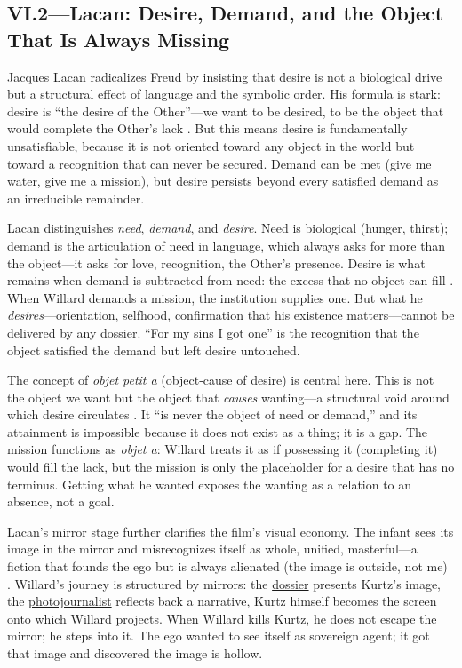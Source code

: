 \subsection*{VI.2—Lacan: Desire, Demand, and the Object That Is Always Missing}
\label{ssec:vi-lacan}

Jacques Lacan radicalizes Freud by insisting that desire is not a biological drive but a
structural effect of language and the symbolic order. His formula is stark: desire is ``the
desire of the Other''---we want to be desired, to be the object that would complete the
Other's lack \parencite{LacanEcrits2006}. But this means desire is fundamentally
unsatisfiable, because it is not oriented toward any object in the world but toward a
recognition that can never be secured. Demand can be met (give me water, give me a mission),
but desire persists beyond every satisfied demand as an irreducible remainder.

Lacan distinguishes \emph{need}, \emph{demand}, and \emph{desire}. Need is biological (hunger,
thirst); demand is the articulation of need in language, which always asks for more than the
object---it asks for love, recognition, the Other's presence. Desire is what remains when
demand is subtracted from need: the excess that no object can fill
\parencite{LacanEcrits2006}. When Willard demands a mission, the institution supplies one. But
what he \emph{desires}---orientation, selfhood, confirmation that his existence
matters---cannot be delivered by any dossier. ``For my sins I got one'' is the recognition
that the object satisfied the demand but left desire untouched.

The concept of \emph{objet petit a} (object-cause of desire) is central here. This is not the
object we want but the object that \emph{causes} wanting---a structural void around which
desire circulates \parencite[p.~103]{LacanSeminarXI1991}. It ``is never the object of need or
demand,'' and its attainment is impossible because it does not exist as a thing; it is a gap.
The mission functions as \emph{objet a}: Willard treats it as if possessing it (completing it)
would fill the lack, but the mission is only the placeholder for a desire that has no
terminus. Getting what he wanted exposes the wanting as a relation to an absence, not a goal.

Lacan's mirror stage further clarifies the film's visual economy. The infant sees its image in
the mirror and misrecognizes itself as whole, unified, masterful---a fiction that founds the
ego but is always alienated (the image is outside, not me) \parencite{LacanEcrits2006}.
Willard's journey is structured by mirrors: the \hyperref[scene:briefing]{dossier} presents
Kurtz's image, the \hyperref[scene:kurtz-compound]{photojournalist} reflects back a narrative,
Kurtz himself becomes the screen onto which Willard projects. When Willard kills Kurtz, he
does not escape the mirror; he steps into it. The ego wanted to see itself as sovereign agent;
it got that image and discovered the image is hollow.

